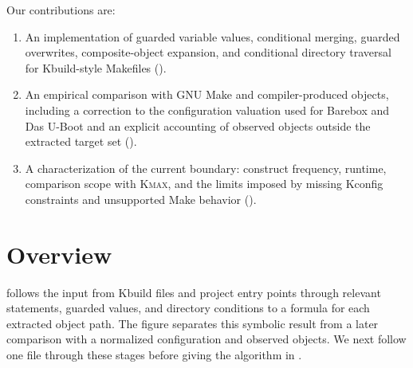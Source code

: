 \documentclass[acmsmall,screen,review]{acmart}
\begin{document}
Our contributions are:
\begin{enumerate}
\item An implementation of guarded variable values, conditional merging, guarded overwrites, composite-object expansion, and conditional directory traversal for Kbuild-style Makefiles ().
\item An empirical comparison with GNU Make and compiler-produced objects, including a correction to the configuration valuation used for Barebox and Das U-Boot and an explicit accounting of observed objects outside the extracted target set ().
\item A characterization of the current boundary: construct frequency, runtime, comparison scope with \textsc{Kmax}, and the limits imposed by missing Kconfig constraints and unsupported Make behavior ().
\end{enumerate}

\section{Overview}
\label{sec:overview}

 follows the input from Kbuild files and project entry points through relevant statements, guarded values, and directory conditions to a formula for each extracted object path. The figure separates this symbolic result from a later comparison with a normalized configuration and observed objects. We next follow one file through these stages before giving the algorithm in .
\end{document}
